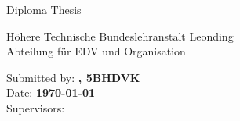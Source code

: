 \cfoot{}
\begin{titlepage}
\thispagestyle{fancy}

\begin{center}

\vspace*{8em}

{\LARGE Diploma Thesis}

\vspace{2em}

{\large H\"ohere Technische Bundeslehranstalt Leonding \\[.5em]
Abteilung f\"ur EDV und Organisation}

\vspace{8em}

{\Huge \varTitle}
\end{center}

\vspace{18em}

Submitted by: {\bf \varAuthor, 5BHDVK} \\[.5em]

Date: {\bf \today} \\[.5em]

Supervisors: {\bf \varSupervisors}
\end{titlepage}